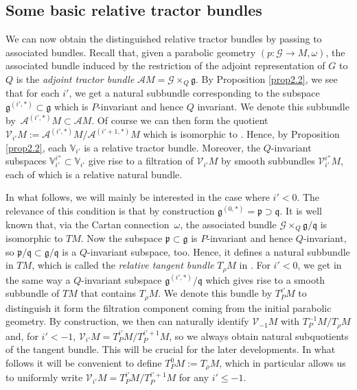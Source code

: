 \documentclass[pdftex]{sigma}
\numberwithin{equation}{section}
\def\frak{\mathfrak}
\def\Bbb{\mathbb}
\def\Cal{\mathcal}
\newcommand{\x}{\times}
\newcommand{\om}{\omega}
\begin{document}
\subsection{Some basic relative tractor bundles}\label{2.3}
We can now obtain the distinguished relative tractor bundles by passing to associated
bundles. Recall that, given a parabolic geometry $(p\colon \Cal G\to M,\om)$, the
associated bundle induced by the restriction of the adjoint representation of $G$ to
$Q$ is the \textit{adjoint tractor bundle} $\Cal AM=\Cal G\x_Q\frak g$. By
Proposition \ref{prop2.2}, we see that for each $i'$, we get a natural subbundle
corresponding to the subspace $\frak g^{(i',*)}\subset\frak g$ which is $P$-invariant
and hence $Q$ invariant. We denote this subbundle by~$\Cal A^{(i',*)}M\subset\Cal
AM$. Of course we can then form the quotient $\Cal V_{i'}M:=\Cal A^{(i',*)}M/\Cal
A^{(i'+1,*)}M$ which is isomorphic to \smash{$\Cal G\x_Q\bigl(\frak g^{(i',*)}/\frak
 g^{(i'+1,*)}\bigr)=\Cal G\x_Q\Bbb V_{i'}$}. Hence, by Proposition \ref{prop2.2}, each
$\Bbb V_{i'}$ is a relative tractor bundle. Moreover, the $Q$-invariant subspaces
$\Bbb V_{i'}^{i''}\subset\Bbb V_{i'}$ give rise to a filtration of $\Cal V_{i'}M$ by
smooth subbundles $\Cal V_{i'}^{i''}M$, each of which is a relative natural bundle.

In what follows, we will mainly be interested in the case where $i'<0$. The relevance
of this condition is that by construction $\frak g^{(0,*)}=\frak p\supset\frak q$. It
is well known that, via the Cartan connection~$\om$, the associated bundle $\Cal
G\x_Q\frak g/\frak q$ is isomorphic to $TM$. Now the subspace $\frak p\subset\frak g$
is $P$-invariant and hence $Q$-invariant, so $\frak p/\frak q\subset\frak g/\frak q$
is a $Q$-invariant subspace, too. Hence, it defines a natural subbundle in $TM$, which
is called the \textit{relative tangent bundle} $T_\rho M$ in \cite{Rel-BGG2}. For
$i'<0$, we get in the same way a $Q$-invariant subspace $\frak g^{(i',*)}/\frak q$
which gives rise to a smooth subbundle of $TM$ that contains $T_\rho M$. We denote
this bundle by $T^{i'}_P M$ to distinguish it form the filtration component coming
from the initial parabolic geometry. By construction, we then can naturally identify
$\Cal V_{-1}M$ with $T^{-1}_PM/T_\rho M$ and, for $i'<-1$, $\Cal
V_{i'}M=T^{i'}_PM/T^{i'+1}_PM$, so we always obtain natural subquotients of the
tangent bundle. This will be crucial for the later developments. In what follows it
will be convenient to define $T^0_PM:=T_\rho M$, which in particular allows us to
uniformly write $\Cal V_{i'}M=T^{i'}_PM/T^{i'+1}_PM$ for any $i'\leq -1$.
\end{document}
